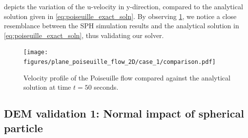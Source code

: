 \documentclass[preprint,12pt]{elsarticle}
\begin{document}
 depicts the variation of the u-velocity in
y-direction, compared to the analytical solution given in
\cref{eq:poiseuille_exact_soln}.  By observing
\cref{fig:poiseuille_soln_graph}, we notice a close resemblance between the
SPH simulation results and the analytical solution in
\cref{eq:poiseuille_exact_soln}, thus validating our solver.
\begin{figure}[!htpb]
  \centering
  \texttt{[image: figures/plane\_poiseuille\_flow\_2D/case\_1/comparison.pdf]}
  \caption{Velocity profile of the Poiseuille flow compared against the
    analytical solution at time $t=50$ seconds.}
  \label{fig:poiseuille_soln_graph}
\end{figure}






\FloatBarrier%
\subsection{DEM validation 1: Normal impact of spherical particle}
\label{sec:DEM_validation_1_normal_impact}
\end{document}
